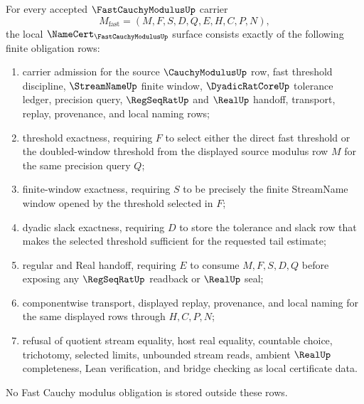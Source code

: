 \begin{theorem}
\label{thm:fast-cauchy-modulus-namecert-obligations}
For every accepted $\FastCauchyModulusUp$ carrier
$$
M_{\mathrm{fast}}=(M,F,S,D,Q,E,H,C,P,N),
$$
the local $\NameCert_{\FastCauchyModulusUp}$ surface consists exactly of the following finite obligation rows:
\begin{enumerate}
\item carrier admission for the source $\CauchyModulusUp$ row, fast threshold discipline, $\StreamNameUp$ finite window, $\DyadicRatCoreUp$ tolerance ledger, precision query, $\RegSeqRatUp$ and $\RealUp$ handoff, transport, replay, provenance, and local naming rows;
\item threshold exactness, requiring $F$ to select either the direct fast threshold or the doubled-window threshold from the displayed source modulus row $M$ for the same precision query $Q$;
\item finite-window exactness, requiring $S$ to be precisely the finite StreamName window opened by the threshold selected in $F$;
\item dyadic slack exactness, requiring $D$ to store the tolerance and slack row that makes the selected threshold sufficient for the requested tail estimate;
\item regular and Real handoff, requiring $E$ to consume $M,F,S,D,Q$ before exposing any $\RegSeqRatUp$ readback or $\RealUp$ seal;
\item componentwise transport, displayed replay, provenance, and local naming for the same displayed rows through $H,C,P,N$;
\item refusal of quotient stream equality, host real equality, countable choice, trichotomy, selected limits, unbounded stream reads, ambient $\RealUp$ completeness, Lean verification, and bridge checking as local certificate data.
\end{enumerate}
No Fast Cauchy modulus obligation is stored outside these rows.
\end{theorem}
